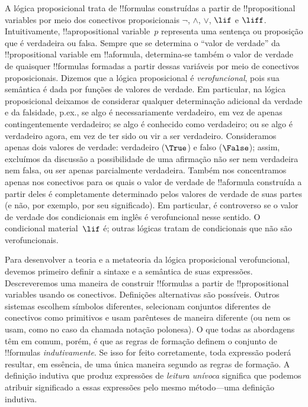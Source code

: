 \documentclass[../../../include/open-logic-section]{subfiles}
\begin{document}


A lógica proposicional trata de !!{formula}s construídas a partir de
!!{propositional variable}s por meio dos conectivos proposicionais
$\lnot$, $\land$, $\lor$, $\lif$ e $\liff$. Intuitivamente,
!!a{propositional variable}~$p$ representa uma sentença ou proposição
que é verdadeira ou falsa. Sempre que se determina o ``valor de verdade'' da
!!{propositional variable} em !!a{formula}, determina-se também o
valor de verdade de quaisquer !!{formula}s formadas a partir dessas variáveis por meio de conectivos
proposicionais. Dizemos que a lógica proposicional é \emph{verofuncional},
pois sua semântica é dada por funções de valores de
verdade. Em particular, na lógica proposicional deixamos de
considerar qualquer determinação adicional da verdade e da falsidade, p.ex.,
se algo é necessariamente verdadeiro, em vez de apenas contingentemente
verdadeiro; se algo é conhecido como verdadeiro; ou se algo
é verdadeiro agora, em vez de ter sido ou vir a ser verdadeiro. Consideramos apenas
dois valores de verdade: verdadeiro ($\True$) e falso ($\False$); assim, excluímos
da discussão a possibilidade de uma afirmação não ser nem verdadeira
nem falsa, ou ser apenas parcialmente verdadeira. Também nos concentramos apenas nos conectivos para os quais
o valor de verdade de !!a{formula} construída a partir deles é completamente
determinado pelos valores de verdade de suas partes (e não, por exemplo, por seu
significado). Em particular, é controverso se o valor de verdade dos condicionais em
inglês é verofuncional nesse sentido. O condicional material~$\lif$ é;
outras lógicas tratam de condicionais que não são verofuncionais.

Para desenvolver a teoria e a metateoria da lógica proposicional
verofuncional, devemos primeiro definir a sintaxe e a semântica de
suas expressões. Descreveremos uma maneira de construir
!!{formula}s a partir de !!{propositional variable}s usando os conectivos.
Definições alternativas são possíveis. Outros sistemas escolhem
símbolos diferentes, selecionam conjuntos diferentes de conectivos como
primitivos e usam parênteses de maneira diferente (ou nem os usam,
como no caso da chamada notação polonesa). O que todas as abordagens
têm em comum, porém, é que as regras de formação definem o conjunto de
!!{formula}s \emph{indutivamente}. Se isso for feito corretamente, toda expressão
poderá resultar, em essência, de uma única maneira segundo as regras de
formação. A definição indutiva que produz expressões de
\emph{leitura unívoca} significa que podemos atribuir significado a essas
expressões pelo mesmo método---uma definição indutiva.
\end{document}
